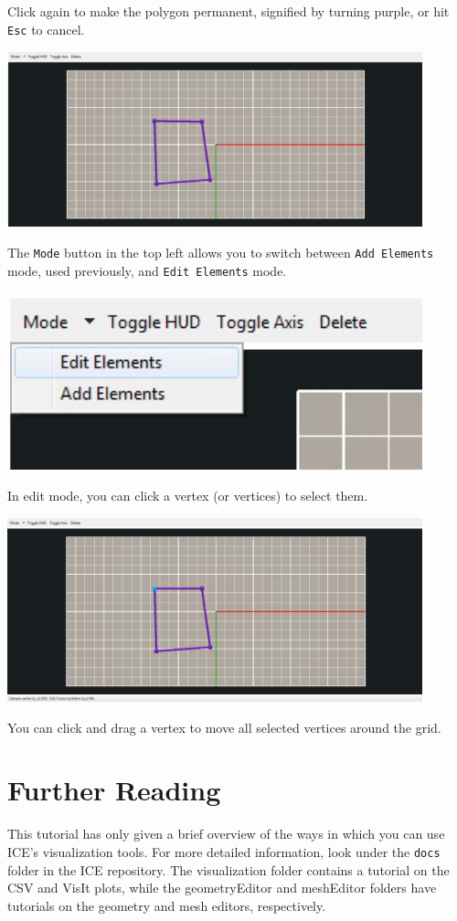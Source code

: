 \documentclass{article}
\begin{document}
Click again to make the polygon permanent, signified by turning purple, or hit
\texttt{Esc} to cancel.

\begin{center}
\includegraphics[width=12cm]{images/NewPolygon}
\end{center}

The \texttt{Mode} button in the top left allows you to switch between
\texttt{Add Elements} mode, used previously, and \texttt{Edit Elements} mode.

\begin{center}
\includegraphics[width=12cm]{images/EditMode}
\end{center}

In edit mode, you can click a vertex (or vertices) to select them. 

\begin{center}
\includegraphics[width=12cm]{images/SelectedVertex}
\end{center}

You can click and drag a vertex to move all selected vertices around the grid.

\section{Further Reading}

This tutorial has only given a brief overview of the ways in which you can use
ICE's visualization tools. For more detailed information, look under the
\texttt{docs} folder in the ICE repository. The visualization folder contains a
tutorial on the CSV and VisIt plots, while the geometryEditor and meshEditor
folders have tutorials on the geometry and mesh editors, respectively. 
\end{document}
